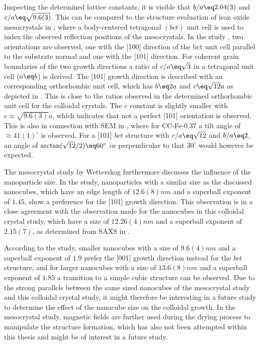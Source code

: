 \documentclass[\main/dresen_thesis.tex]{subfiles}
\begin{document}
  Inspecting the determined lattice constants, it is visible that $b/a \eq 2.04(3)$ and $c/a \eq \sqrt{9.6(3)}$.
  This can be compared to the structure evaluation of iron oxide mesocrystals in \cite{Wetterskog_2016_Tunin}, where a body-centered tetragonal $(bct)$ unit cell is used to index the observed reflection positions of the mesocrystals.
  In the study \cite{Wetterskog_2016_Tunin}, two orientations are observed, one with the [100] direction of the bct unit cell parallel to the substrate normal and one with the [101] direction.
  For coherent grain boundaries of the two growth directions a ratio of $c/a \eq \sqrt{3}$ in a tetragonal unit cell ($a \eq b$) is derived.
  The [101] growth direction is described with an corresponding orthorhombic unit cell, which has $b \eq 2 a$ and $c \eq \sqrt{12} a$ as depicted in .
  This is close to the ratios observed in the determined orthorhombic unit cell for the colloidal crystals.
  The $c$ constant is slightly smaller with $c \approx \sqrt{9.6(3)} a$, which indicates that not a perfect [101] orientation is observed.
  This is also in connection with SEM in , where for CC-Fe-0.37 a tilt angle of $\approx 41(1) ^\circ$ is observed.
  For a [101] $bct$ structure with $c/a \eq \sqrt{12}$ and $b/a \eq 2$, an angle of $\arctan(\sqrt{12}/2) \eq 60 ^\circ$ or perpendicular to that $30^\circ$ would however be expected.

  The mesocrystal study by Wetterskog \etal \cite{Wetterskog_2016_Tunin} furthermore discusses the influence of the nanoparticle size.
  In the study, nanoparticles with a similar size as the discussed nanocubes, which have an edge length of $12.6(8) \unit{nm}$ and a superball exponent of $1.45$, show a preference for the [101] growth direction.
  This observation is in a close agreement with the observation made for the nanocubes in this colloidal crystal study, which have a size of $12.26(4) \unit{nm}$ and a superball exponent of $2.15(7)$, as determined from SAXS in .

  According to the study, smaller nanocubes with a size of $9.6(4) \unit{nm}$ and a superball exponent of $1.9$ prefer the [001] growth direction instead for the $bct$ structure, and for larger nanocubes with a size of $13.6(8) \unit{nm}$ and a superball exponent of $1.85$ a transition to a simple cubic structure can be observed.
  Due to the strong parallels between the same sized nanocubes of the mesocrystal study and this colloidal crystal study, it might therefore be interesting in a future study to determine the effect of the nanocube size on the colloidal growth.
  In the mesocrystal study, magnetic fields are further used during the drying process to manipulate the structure formation, which has also not been attempted within this thesis and might be of interest in a future study.
\end{document}
